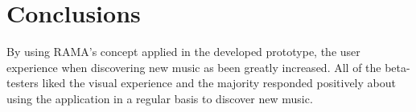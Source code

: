 \documentclass[twocolumn]{article}
\begin{document}
\section{Conclusions}
\label{sec:conclusions}

  By using RAMA's concept applied in the developed prototype, the user experience when discovering new music as been greatly increased.
  All of the beta-testers liked the visual experience and the majority responded positively about using the application in a regular basis to discover new music.



\end{document}
